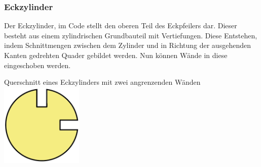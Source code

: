 \subsubsection{Eckzylinder}
Der Eckzylinder, im Code  stellt den oberen Teil des Eckpfeilers dar.
Dieser besteht aus einem zylindrischen Grundbauteil mit Vertiefungen.
Diese Entstehen, indem Schnittmengen zwischen dem Zylinder und in Richtung der ausgehenden Kanten gedrehten Quader gebildet werden.
Nun können Wände in diese eingeschoben werden.
\begin{Bild}{Querschnitt eines Eckzylinders mit zwei angrenzenden Wänden}
	\includegraphics[height=150px]{Bilder/CornerCylinder2D-06.png}
\end{Bild}

